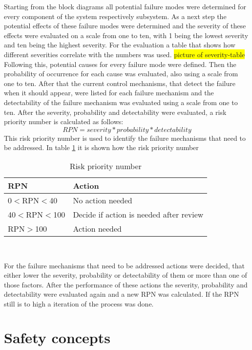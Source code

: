 \documentclass[ExampleMasters.tex]{subfiles}
\begin{document}
Starting from the block diagrams all potential failure modes were determined for every component of the system respectively subsystem. As a next step the potential effects of these failure modes were determined and the severity of these effects were evaluated on a scale from one to ten,  with 1 being the lowest severity and ten being the highest severity. For the evaluation a table that shows how different severities correlate with the numbers was used. \colorbox{yellow}{picture of severity-table}
Following this, potential causes for every failure mode were defined. Then the probability of occurrence for each cause was evaluated, also using a scale from one to ten.
After that the current control mechanisms, that detect the failure when it should appear, were listed for each failure mechanism and the detectability of the failure mechanism was evaluated using a scale from one to ten.
After the severity, probability and detectability were evaluated, a risk priority number is calculated as follows: 
\begin{equation*}
RPN=severity*probability*detectability
\end{equation*}      
This risk priority number is used to identify the failure mechanisms that need to be addressed. In table \ref{tab:RPN} it is shown how the risk priority number  
\begin{table}[h]
	\centering
	\caption{Risk priority number}
	\label{tab:RPN}
	\begin{tabular}{l|l|}
		RPN   & Action  \\ \hline
		0$<$RPN$<$40     &       No action needed           \\
		40$<$RPN$<$100   &      Decide if action is needed after review      \\
		RPN$>$100 &      Action needed         \\
		
	\end{tabular} \\
\end{table}
For the failure mechanisms that need to be addressed actions were decided, that either lower the severity, probability or detectability of them or more than one of those factors. After the performance of these actions the severity, probability and detectability were evaluated again and a new RPN was calculated. If the RPN still is to high a iteration of the process was done.  

\section{Safety concepts}
\label{sec:safetyconcepts}
\end{document}
